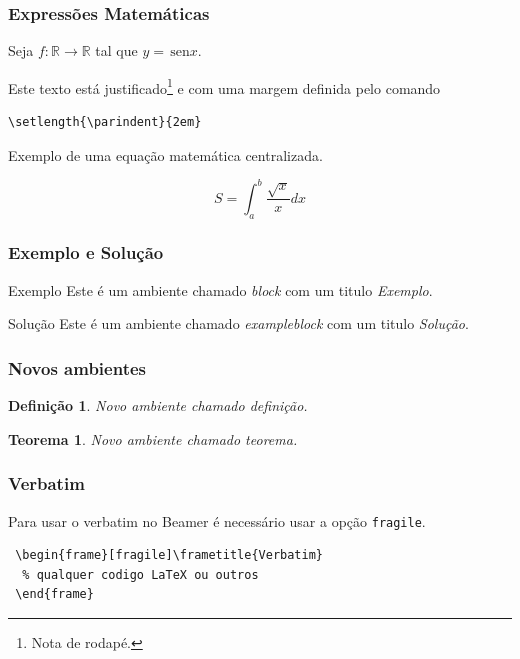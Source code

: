 \documentclass[aspectratio=169]{beamer}
\theoremstyle{Definition}
\newtheorem{defn}{Defini\c c\~ao}
\newtheorem{teo}[theorem]{Teorema}
\providecommand{\sin}{} \renewcommand{\sin}{\hspace{2pt}\textrm{sen}}
\newcommand{\R}{\mathbb{R}}
\begin{document}
\begin{frame}[fragile]\frametitle{Express\~oes Matem\'aticas}

\setlength{\parindent}{2em}

Seja $f: \R \to \R$ tal que $y = \sin x$.

Este texto est\'a justificado\footnote{Nota de rodap\'e.} e com uma margem definida pelo comando

\begin{verbatim}
\setlength{\parindent}{2em}
\end{verbatim}

Exemplo de uma equa\c c\~ao matem\'atica centralizada.

\[
S = \int_a^b \frac{\sqrt x}{x}dx
\]
\end{frame}

\begin{frame}\frametitle{Exemplo e Solu\c c\~ao}
  
  \begin{block}{Exemplo}
    Este \'e um ambiente chamado \emph{block} com um titulo \emph{Exemplo}.\cite{knuth}\cite{lamport}
  \end{block}

  \begin{exampleblock}{Solu\c c\~ao}
    Este \'e um ambiente chamado \emph{exampleblock} com um titulo \emph{Solu\c c\~ao}.
  \end{exampleblock}

\end{frame}

\begin{frame}\frametitle{Novos ambientes}
  
  \begin{defn}
    Novo ambiente chamado \emph{defini\c c\~ao}.
  \end{defn}

  \begin{teo}
    Novo ambiente chamado \emph{teorema}.
  \end{teo}

\end{frame}

\begin{frame}[fragile]\frametitle{Verbatim}
Para usar o verbatim no Beamer \'e necess\'ario usar a op\c c\~ao \verb|fragile|.

\begin{verbatim}
 \begin{frame}[fragile]\frametitle{Verbatim}
  % qualquer codigo LaTeX ou outros
 \end{frame}
\end{verbatim}

\end{frame}
\end{document}
